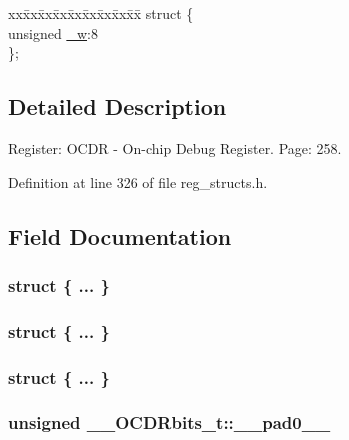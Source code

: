 \begin{DoxyCompactItemize}
\begin{tabbing}
\end{tabbing}\item 
\begin{tabbing}
xx\=xx\=xx\=xx\=xx\=xx\=xx\=xx\=xx\=\kill
struct \{\\
\>unsigned \hyperlink{union_____o_c_d_rbits__t_a26f35366ea5390befe3dfda9cf6142fe}{\_w}:8\\
\}; \\

\end{tabbing}\end{DoxyCompactItemize}


\subsection{Detailed Description}
Register\+: O\+C\+D\+R -\/ On-\/chip Debug Register. Page\+: 258. 

Definition at line 326 of file reg\+\_\+structs.\+h.



\subsection{Field Documentation}
\hypertarget{union_____o_c_d_rbits__t_a59cae4375bc0cdf933a4096484fcf68b}{\subsubsection[{"@77}]{\setlength{\rightskip}{0pt plus 5cm}struct \{ ... \} }}\label{union_____o_c_d_rbits__t_a59cae4375bc0cdf933a4096484fcf68b}
\hypertarget{union_____o_c_d_rbits__t_a104fcf285fdf36abdfd4ceb8913f89b1}{\subsubsection[{"@79}]{\setlength{\rightskip}{0pt plus 5cm}struct \{ ... \} }}\label{union_____o_c_d_rbits__t_a104fcf285fdf36abdfd4ceb8913f89b1}
\hypertarget{union_____o_c_d_rbits__t_a7d2e6d0d7bfc76e6861cd96fa4bef9db}{\subsubsection[{"@81}]{\setlength{\rightskip}{0pt plus 5cm}struct \{ ... \} }}\label{union_____o_c_d_rbits__t_a7d2e6d0d7bfc76e6861cd96fa4bef9db}
\hypertarget{union_____o_c_d_rbits__t_a1705102b6a99e45807350fa24abf9014}{
\subsubsection[{\+\_\+\+\_\+pad0\+\_\+\+\_\+}]{\setlength{\rightskip}{0pt plus 5cm}unsigned \+\_\+\+\_\+\+O\+C\+D\+Rbits\+\_\+t\+::\+\_\+\+\_\+pad0\+\_\+\+\_\+}}\label{union_____o_c_d_rbits__t_a1705102b6a99e45807350fa24abf9014}


